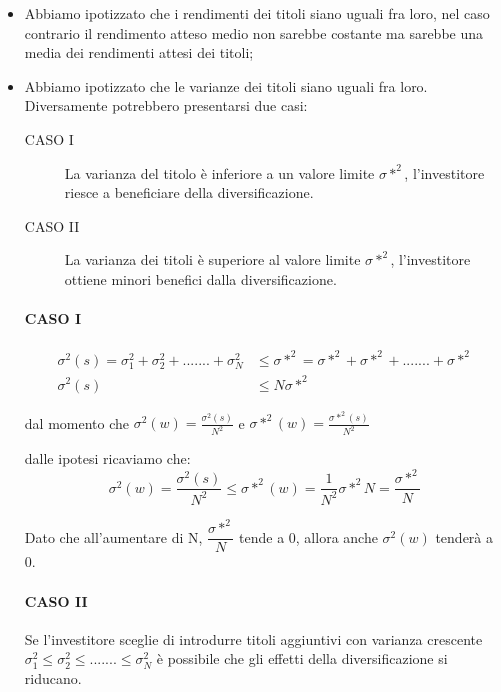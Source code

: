 \begin{itemize}
	\item Abbiamo ipotizzato che i rendimenti dei titoli siano uguali fra loro, nel caso contrario il rendimento atteso medio non sarebbe costante ma sarebbe una media dei rendimenti attesi dei titoli;
	\item Abbiamo ipotizzato che le varianze dei titoli siano uguali fra loro. Diversamente potrebbero presentarsi due casi:  
\begin{description}
	\item[CASO I] La varianza del titolo è inferiore a un valore limite $\sigma*^{2}$, l'investitore riesce a beneficiare della diversificazione.
	\item[CASO II] La varianza dei titoli è superiore al valore limite $\sigma*^{2}$, l'investitore ottiene minori benefici dalla diversificazione. 
\end{description}
	\paragraph{CASO I}

	\begin{equation}
	\begin{split}
	\sigma^{2}(s)= \sigma^{2}_1+\sigma^{2}_2 +.......+ \sigma^{2}_N &\leq
	\sigma*^{2}= \sigma*^{2}+\sigma*^{2}+.......+ \sigma*^{2} \\
	\sigma^{2}(s)&\leq N\sigma*^{2}
	\end{split}	
	\end{equation}

	dal momento che $\sigma^{2}(w)= \frac{\sigma^{2}(s)}{N^2} $ e $\sigma*^{2}(w)= \frac{\sigma*^{2}(s)}{N^2}$

	dalle ipotesi ricaviamo che: 
	\begin{equation}
	\sigma^{2}(w)= \frac{\sigma^{2}(s)}{N^2} \leq \sigma*^{2}(w)= \frac{1}{N^2}\sigma*^{2} N =\frac{\sigma*^{2}}{N}
	\end{equation}
	
	Dato che all'aumentare di N, $\dfrac{\sigma*^{2}}{N}$ tende a 0, allora anche $\sigma^{2}(w)$ tenderà a 0.
	
\paragraph{CASO II}
	
Se l'investitore sceglie di introdurre titoli aggiuntivi con varianza crescente $\sigma^{2}_1\leq\sigma^{2}_2 \leq.......\leq \sigma^{2}_N$ è possibile che gli effetti della diversificazione si riducano. 
	

\end{itemize}
